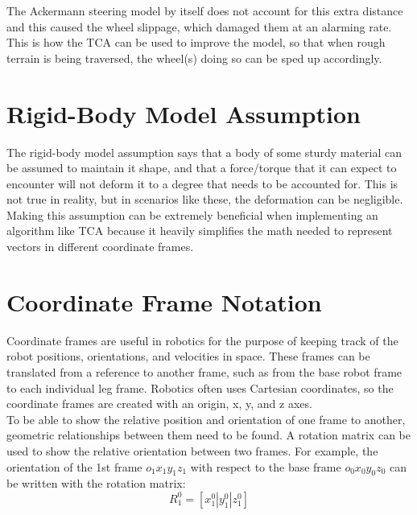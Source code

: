 The Ackermann steering model by itself does not account for this extra distance and this caused the wheel slippage, which damaged them at an alarming rate. This is how the \ac{TCA} can be used to improve the model, so that when rough terrain is being traversed, the wheel(s) doing so can be sped up accordingly.

\section{Rigid-Body Model Assumption}\label{traction_control:algorithms:rigid-body}
The rigid-body model assumption says that a body of some sturdy material can be assumed to maintain it shape, and that a force/torque that it can expect to encounter will not deform it to a degree that needs to be accounted for. This is not true in reality, but in scenarios like these, the deformation can be negligible. \\

Making this assumption can be extremely beneficial when implementing an algorithm like \ac{TCA} because it heavily simplifies the math needed to represent vectors in different coordinate frames.

\section{Coordinate Frame Notation}
%

Coordinate frames are useful in robotics for the purpose of keeping track of the robot positions, orientations, and velocities in space. These frames can be translated from  a reference to another frame, such as from the base robot frame to each individual leg frame. Robotics often uses Cartesian coordinates, so the coordinate frames are created with an origin, x, y, and z axes. \\

To be able to show the relative position and orientation of one frame to another, geometric relationships between them need to be found. A rotation matrix can be used to show the relative orientation between two frames. For example, the orientation of the 1st frame $o_{1}x_{1}y_{1}z_{1}$ with respect to the base frame $o_{0}x_{0}y_{0}z_{0}$ can be written with the rotation matrix:
\begin{equation}\label{traction_control:algorithms:r01}
	R^{0}_{1} = [x^{0}_{1} | y^{0}_{1} | z^{0}_{1}]
\end{equation}

